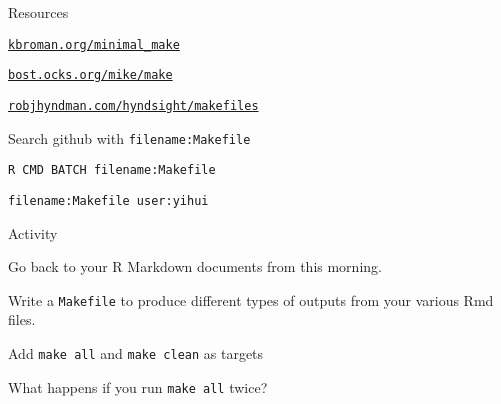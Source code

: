 \documentclass[12pt,t]{beamer}
\begin{document}
\begin{frame}[fragile]{Resources}


  \bbi
  \item \href{https://kbroman.org/minimal_make}{\color{foreground} \tt kbroman.org/minimal\_make}
  \item \href{https://bost.ocks.org/mike/make/}{\color{foreground} \tt bost.ocks.org/mike/make}
  \item \href{https://robjhyndman.com/hyndsight/makefiles/}{\color{foreground} \tt robjhyndman.com/hyndsight/makefiles}
  \item Search github with {\tt filename:Makefile}

    \bi
    \item {\color{hilit} \verb|R CMD BATCH filename:Makefile|}

    \item {\color{hilit} \verb|filename:Makefile user:yihui|}
     \ei

  \ei


\end{frame}

\begin{frame}[c]{Activity}

  Go back to your R Markdown documents from this morning.

  \bbi
  \item Write a {\tt Makefile} to produce different types of outputs
    from your various Rmd files.

  \item Add {\tt make all} and {\tt make clean} as targets

  \item What happens if you run {\tt make all} twice?
  \ei


\end{frame}
\end{document}
